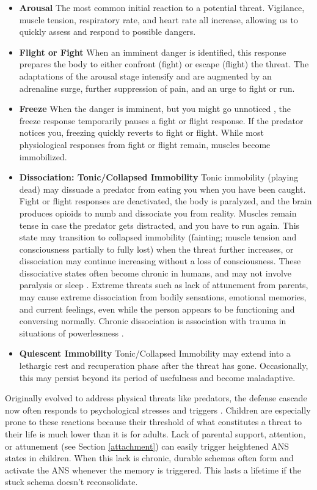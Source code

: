 \documentclass[12pt,letterpaper]{article}
\begin{document}
\begin{itemize}
    \item \textbf{Arousal} The most common initial reaction to a potential threat. Vigilance, muscle tension, respiratory rate, and heart rate all increase, allowing us to quickly assess and respond to possible dangers.
    \item \textbf{Flight or Fight} When an imminent danger is identified, this response prepares the body to either confront (fight) or escape (flight) the threat. The adaptations of the arousal stage intensify and are augmented by an adrenaline surge, further suppression of pain, and an urge to fight or run.
    \item \textbf{Freeze} When the danger is imminent, but you might go unnoticed , the freeze response temporarily pauses a fight or flight response. If the predator notices you, freezing quickly reverts to fight or flight. While most physiological responses from fight or flight remain, muscles become immobilized.
    \item \textbf{Dissociation: Tonic/Collapsed Immobility} Tonic immobility (playing dead) may dissuade a predator from eating you when you have been caught. Fight or flight responses are deactivated, the body is paralyzed, and the brain produces opioids to numb and dissociate you from reality. Muscles remain tense in case the predator gets distracted, and you have to run again. This state may transition to collapsed immobility (fainting; muscle tension and consciousness partially to fully lost) when the threat further increases, or dissociation may continue increasing without a loss of consciousness. These dissociative states often become chronic in humans, and may not involve paralysis or sleep \cite{razviPSIP}. Extreme threats such as lack of attunement from parents, may cause extreme dissociation from bodily sensations, emotional memories, and current feelings, even while the person appears to be functioning and conversing normally. Chronic dissociation is association with trauma in situations of powerlessness \cite{loewensteinDissociation}. 
    \item \textbf{Quiescent Immobility} Tonic/Collapsed Immobility may extend into a lethargic rest and recuperation phase after the threat has gone. Occasionally, this may persist beyond its period of usefulness and become maladaptive.
\end{itemize}
Originally evolved to address physical threats like predators, the defense cascade now often responds to psychological stresses and triggers \cite{razviPSIP}. Children are especially prone to these reactions because their threshold of what constitutes a threat to their life is much lower than it is for adults. Lack of parental support, attention, or attunement (see Section \ref{attachment}) can easily trigger heightened ANS states in children. When this lack is chronic, durable schemas often form and activate the ANS whenever the memory is triggered. This lasts a lifetime if the stuck schema doesn't reconsolidate.
\end{document}
